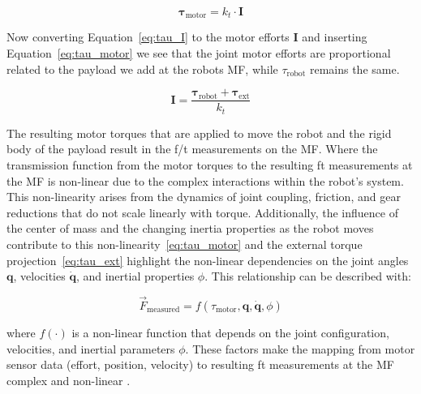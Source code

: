     \begin{equation}
    \boldsymbol{\tau}_{\text{motor}} = k_t \cdot \boldsymbol{I} 
    \label{eq:tau_I}
    \end{equation}

    Now converting Equation~\eqref{eq:tau_I} to the motor efforts \(\mathbf{I}\) and inserting Equation~\eqref{eq:tau_motor}
    we see that the joint motor efforts are proportional related to the payload we add at the robots MF, while \(\tau_{\text{robot}}\) remains the same.
    
    \begin{equation}
    \boldsymbol{I} = \frac{\boldsymbol{\tau}_{\text{robot}} + \boldsymbol{\tau}_{\text{ext}}}{k_t}
    \label{eq:I_payload}
    \end{equation}

    The resulting motor torques that are applied to move the robot and the rigid body of the payload result in the f/t measurements on the MF. Where the transmission function from the motor torques to the resulting ft measurements at the MF is non-linear due to the complex interactions within the robot's system. This non-linearity arises from the dynamics of joint coupling, friction, and gear reductions that do not scale linearly with torque. Additionally, the influence of the center of mass and the changing inertia properties as the robot moves contribute to this non-linearity~\eqref{eq:tau_motor} and the external torque projection~\eqref{eq:tau_ext} highlight the non-linear dependencies on the joint angles \(\mathbf{q}\), velocities \(\dot{\mathbf{q}}\), and inertial properties \(\phi\). This relationship can be described with:
    
    \begin{equation}
    \vec{F}_{\text{measured}} = f(\tau_{\text{motor}}, \mathbf{q}, \dot{\mathbf{q}}, \phi)
    \label{eq:f_measured}
    \end{equation}
    
    where \( f(\cdot) \) is a non-linear function that depends on the joint configuration, velocities, and inertial parameters \(\phi\). These factors make the mapping from motor sensor data (effort, position, velocity) to resulting ft measurements at the MF complex and non-linear \cite{liu2019end, blumberg2023estimation}.

